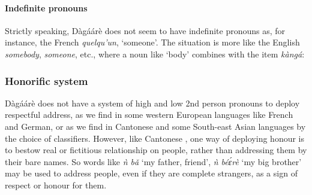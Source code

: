 \begin{refsection}
\paragraph{Indefinite pronouns}



Strictly speaking, Dàgáárè does not seem to have indefinite pronouns as, for
instance, the French \textit{quelqu’un}, ‘someone’. The situation is more like the English \textit{somebody},
\textit{someone}, etc., where a noun like `body' combines with the item \textit{kàngá}:

\ea {}
\z\z

\subsubsection{Honorific system}
Dàgáárè does not have a system of high and low 2nd person pronouns to deploy
respectful address, as we find in some western European languages like French and German,
or as we find in Cantonese and some South-east Asian languages by the choice of classifiers.
However, like Cantonese \citep{Siew-Yue1993}, one way of deploying honour is to bestow real or
fictitious relationship on people, rather than addressing them by their bare names. So words
like \textit{ǹ bǎ} ‘my father, friend’, \textit{ǹ béɛ́rè} ‘my big brother’ may be used to address people, even if
they are complete strangers, as a sign of respect or honour for them.


\end{refsection}
